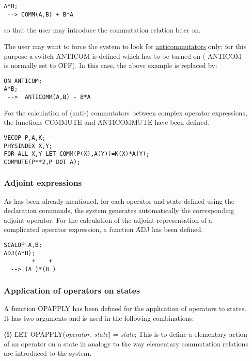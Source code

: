 \begin{verbatim}
A*B;
 --> COMM(A,B) + B*A
\end{verbatim}
so that the user may introduce the commutation relation later on.

The user may want to force the system to look for
\underline{anticommutators} only; for this purpose a switch \f{ANTICOM}
is defined which has to be turned on ( \f{ANTICOM} is normally set to
\f{OFF}). In this case, the above example is replaced by:

\begin{verbatim}
ON ANTICOM;
A*B;
 -->  ANTICOMM(A,B) - B*A
\end{verbatim}

For the calculation of (anti-) commutators between complex
operator
expressions, the functions \f{COMMUTE} and
\f{ANTICOMMUTE} have been defined.

\begin{verbatim}
VECOP P,A,K;
PHYSINDEX X,Y;
FOR ALL X,Y LET COMM(P(X),A(Y))=K(X)*A(Y);
COMMUTE(P**2,P DOT A);
\end{verbatim}

\subsubsection{Adjoint expressions}

As has been already mentioned, for each operator and state defined
using the declaration commands, the system
generates automatically the corresponding adjoint operator. For the
calculation of the adjoint representation of a complicated
operator expression, a function  \f{ADJ} has been defined.

\begin{verbatim}
SCALOP A,B;
ADJ(A*B);
        +    +
  --> (A )*(B )
\end{verbatim}

\subsubsection{Application of operators on states}

A function \f{OPAPPLY} has been
defined for the application of operators to states.
It has two arguments and is used in the following combinations:

{\bf (i)}  \f{LET OPAPPLY(}{\it operator, state}\f{) =} {\it state};
This is to define a elementary
action of an operator on a state in analogy to the way
elementary commutation relations are introduced to the system.

